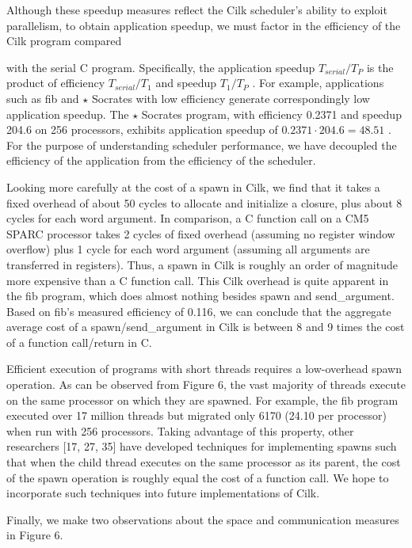 \documentclass[
]{article}
\begin{document}
Although these speedup measures reflect the Cilk scheduler's ability to
exploit parallelism, to obtain application speedup, we must factor in
the efficiency of the Cilk program compared

with the serial C program. Specifically, the application speedup
\(T_{serial}/T_{P}\) is the product of efficiency \(T_{serial}/T_{1}\)
and speedup \(T_{1}/T_{P}\) . For example, applications such as fib and
\(\star\) Socrates with low efficiency generate correspondingly low
application speedup. The \(\star\) Socrates program, with efficiency
0.2371 and speedup 204.6 on 256 processors, exhibits application speedup
of \(0.2371 \cdot 204.6 = 48.51\) . For the purpose of understanding
scheduler performance, we have decoupled the efficiency of the
application from the efficiency of the scheduler.

Looking more carefully at the cost of a spawn in Cilk, we find that it
takes a fixed overhead of about 50 cycles to allocate and initialize a
closure, plus about 8 cycles for each word argument. In comparison, a C
function call on a CM5 SPARC processor takes 2 cycles of fixed overhead
(assuming no register window overflow) plus 1 cycle for each word
argument (assuming all arguments are transferred in registers). Thus, a
spawn in Cilk is roughly an order of magnitude more expensive than a C
function call. This Cilk overhead is quite apparent in the fib program,
which does almost nothing besides spawn and send\_argument. Based on
fib's measured efficiency of 0.116, we can conclude that the aggregate
average cost of a spawn/send\_argument in Cilk is between 8 and 9 times
the cost of a function call/return in C.

Efficient execution of programs with short threads requires a
low-overhead spawn operation. As can be observed from Figure 6, the vast
majority of threads execute on the same processor on which they are
spawned. For example, the fib program executed over 17 million threads
but migrated only 6170 (24.10 per processor) when run with 256
processors. Taking advantage of this property, other researchers {[}17,
27, 35{]} have developed techniques for implementing spawns such that
when the child thread executes on the same processor as its parent, the
cost of the spawn operation is roughly equal the cost of a function
call. We hope to incorporate such techniques into future implementations
of Cilk.

Finally, we make two observations about the space and communication
measures in Figure 6.
\end{document}
